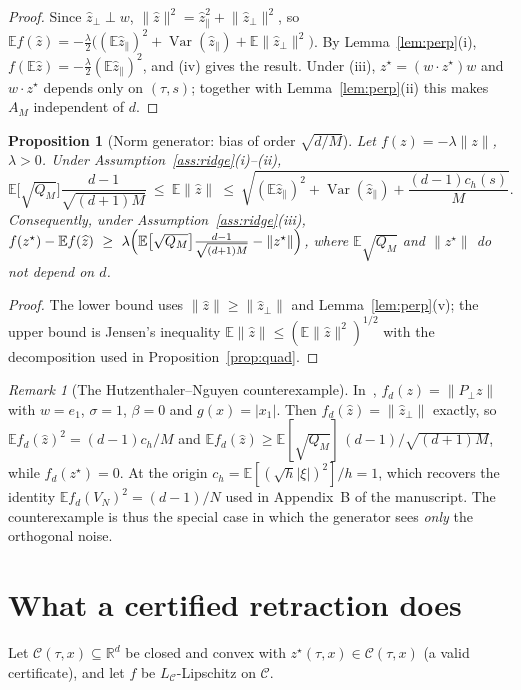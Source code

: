 \documentclass[11pt]{article}
\newtheorem{proposition}[lemma]{Proposition}
\theoremstyle{remark}
\newtheorem{remark}[lemma]{Remark}
\theoremstyle{definition}
\newcommand{\E}{\mathbb E}
\newcommand{\R}{\mathbb R}
\newcommand{\norm}[1]{\lVert #1\rVert}
\newcommand{\zh}{\widehat z}
\newcommand{\zpar}{\widehat z_{\parallel}}
\newcommand{\zperp}{\widehat z_{\perp}}
\newcommand{\Pperp}{P_{\perp}}
\begin{document}
\begin{proof}
Since $\zperp\perp w$, $\norm{\zh}^2=\zpar^2+\norm{\zperp}^2$, so
$\E f(\zh)=-\tfrac\lambda2\bigl((\E\zpar)^2+\operatorname{Var}(\zpar)+\E\norm{\zperp}^2\bigr)$.
By Lemma~\ref{lem:perp}(i), $f(\E\zh)=-\tfrac\lambda2(\E\zpar)^2$, and (iv) gives the
result. Under (iii), $z^\star=(w\cdot z^\star)w$ and $w\cdot z^\star$ depends only on
$(\tau,s)$; together with Lemma~\ref{lem:perp}(ii) this makes $A_M$ independent of $d$.
\end{proof}

\begin{proposition}[Norm generator: bias of order $\sqrt{d/M}$]\label{prop:norm}
Let $f(z)=-\lambda\norm{z}$, $\lambda>0$. Under Assumption~\ref{ass:ridge}(i)--(ii),
\[
\E\bigl[\sqrt{Q_M}\bigr]\frac{d-1}{\sqrt{(d+1)M}}\ \le\ \E\norm{\zh}\ \le\
\sqrt{(\E\zpar)^2+\operatorname{Var}(\zpar)+\frac{(d-1)c_h(s)}{M}}.
\]
Consequently, under Assumption~\ref{ass:ridge}(iii),
$f(z^\star)-\E f(\zh)\ \ge\ \lambda\Bigl(\E\bigl[\sqrt{Q_M}\bigr]\tfrac{d-1}{\sqrt{(d+1)M}}-\norm{z^\star}\Bigr)$,
where $\E\sqrt{Q_M}$ and $\norm{z^\star}$ do not depend on $d$.
\end{proposition}

\begin{proof}
The lower bound uses $\norm{\zh}\ge\norm{\zperp}$ and Lemma~\ref{lem:perp}(v); the upper
bound is Jensen's inequality $\E\norm{\zh}\le(\E\norm{\zh}^2)^{1/2}$ with the
decomposition used in Proposition~\ref{prop:quad}.
\end{proof}

\begin{remark}[The Hutzenthaler--Nguyen counterexample]
In~\cite{HN2025}, $f_d(z)=\norm{\Pperp z}$ with $w=e_1$, $\sigma=1$, $\beta=0$ and
$g(x)=|x_1|$. Then $f_d(\zh)=\norm{\zperp}$ exactly, so
$\E f_d(\zh)^2=(d-1)c_h/M$ and $\E f_d(\zh)\ge \E[\sqrt{Q_M}]\,(d-1)/\sqrt{(d+1)M}$,
while $f_d(z^\star)=0$. At the origin $c_h=\E[(\sqrt h|\xi|)^2]/h=1$, which recovers the
identity $\E f_d(V_N)^2=(d-1)/N$ used in Appendix~B of the manuscript. The counterexample
is thus the special case in which the generator sees \emph{only} the orthogonal noise.
\end{remark}

\section{What a certified retraction does}

Let $\mathcal C(\tau,x)\subseteq\R^d$ be closed and convex with
$z^\star(\tau,x)\in\mathcal C(\tau,x)$ (a valid certificate), and let $f$ be
$L_{\mathcal C}$-Lipschitz on $\mathcal C$.
\end{document}

